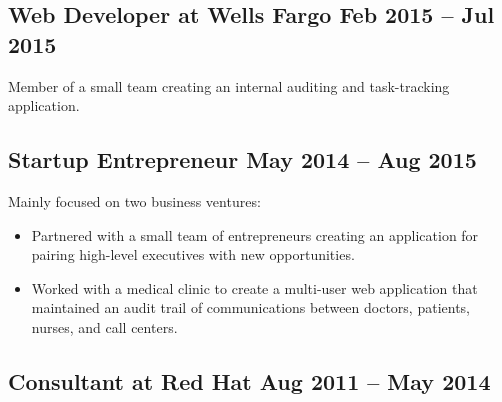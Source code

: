 \documentclass[12pt]{article}
\begin{document}
     
 

\subsection*{Web Developer at Wells Fargo \hfill Feb 2015 -- Jul 2015}

Member of a small team creating an internal auditing and task-tracking
application.

    

\subsection*{Startup Entrepreneur \hfill May 2014 -- Aug 2015}

Mainly focused on two business ventures:

\begin{itemize}
  \item Partnered with a small team of entrepreneurs creating an application for
    pairing high-level executives with new opportunities.

  \item Worked with a medical clinic to create a multi-user web application that
    maintained an audit trail of communications between doctors, patients,
    nurses, and call centers.
\end{itemize}

     
\tag{\LaTeX}

\subsection*{Consultant at Red Hat \hfill Aug 2011 -- May 2014}
\end{document}
